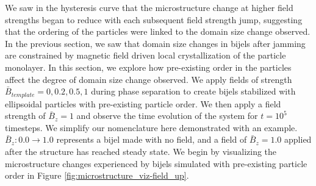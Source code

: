 We saw in the hysteresis curve that the microstructure change at higher
field strengths began to reduce with each subsequent field strength
jump, suggesting that the ordering of the particles were linked to the
domain size change observed. In the previous section, we saw that domain
size changes in bijels after jamming are constrained by magnetic field
driven local crystallization of the particle monolayer. In this section,
we explore how pre-existing order in the particles affect the degree of
domain size change observed. We apply fields of strength
\(\bar{B}_{template} = 0, 0.2, 0.5, 1\) during phase separation to
create bijels stabilized with ellipsoidal particles with pre-existing
particle order. We then apply a field strength of \(\bar{B}_z = 1\) and
observe the time evolution of the system for \(t = 10^5\) timesteps. We
simplify our nomenclature here demonstrated with an example.
\(\bar{B}_z: 0.0 \rightarrow 1.0\) represents a bijel made with no
field, and a field of \(\bar{B}_z = 1.0\) applied after the structure
has reached steady state. We begin by visualizing the microstructure
changes experienced by bijels simulated with pre-existing particle order
in Figure \ref{fig:microstructure_viz-field_up}.

